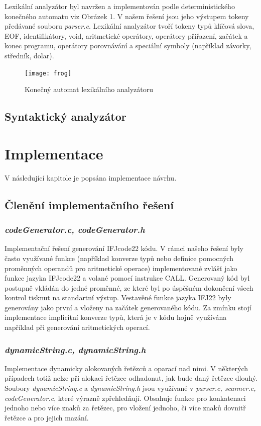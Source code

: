 \documentclass{article}
\begin{document}
Lexikální analyzátor byl navržen a implementován podle deterministického konečného automatu viz Obrázek 1. V našem řešení jsou jeho výstupem tokeny předávané souboru \emph{parser.c}. Lexikální analyzátor tvoří tokeny typů klíčová slova, EOF, identifikátory, void, aritmetické operátory, operátory přiřazení, začátek a konec programu, operátory porovnávání a speciální symboly (například závorky, středník, dolar).

\begin{figure}[h]
    \centering
    \texttt{[image: frog]}
    \caption{Konečný automat lexikálního analyzátoru}
    \label{fig:mesh1}
\end{figure}

\subsection{Syntaktický analyzátor}

\section{Implementace}
V následující kapitole je popsána implementace návrhu.

\subsection{Členění implementačního řešení}

\subsubsection{\emph{codeGenerator.c, codeGenerator.h}}
Implementační řešení generování IFJcode22 kódu. V rámci našeho řešení byly často využívané funkce (například konverze typů nebo definice pomocných proměnných operandů pro aritmetické operace) implementované zvlášť jako funkce jazyka IFJcode22 a volané pomocí instrukce CALL. Generovaný kód byl postupně vkládán do jedné proměnné, ze které byl po úspěšném dokončení všech kontrol tisknut na standartní výstup. Vestavěné funkce jazyka IFJ22 byly generovány jako první a vloženy na začátek generovaného kódu. Za zmínku stojí implementace implicitní konverze typů, která je v kódu hojně využívána například při generování aritmetických operací.

\subsubsection{\emph{dynamicString.c, dynamicString.h}}
Implementace dynamicky alokovaných řetězců a oparací nad nimi. V některých případech totiž nelze při alokaci řetězce odhadonut, jak bude daný řetězec dlouhý. Soubory \emph{dynamicString.c} a \emph{dynamicString.h} jsou využívané v \emph{parser.c, scanner.c, codeGenerator.c}, které výrazně zpřehledňují. Obsahuje funkce pro konkatenaci jednoho nebo více znaků za řetězec, pro vložení jednoho, či více znaků dovnitř řetězce a pro jejich mazání.
\end{document}
